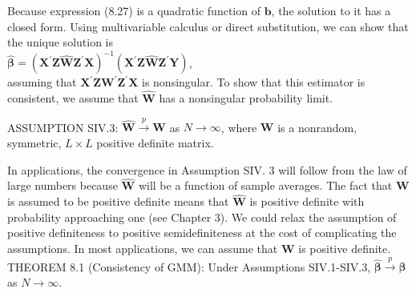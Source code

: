 \documentclass[10pt]{article}
\begin{document}
Because expression (8.27) is a quadratic function of $\mathbf{b}$, the solution to it has a closed form. Using multivariable calculus or direct substitution, we can show that the unique solution is\\
$\hat{\boldsymbol{\beta}}=\left(\mathbf{X}^{\prime} \mathbf{Z} \hat{\mathbf{W}} \mathbf{Z}^{\prime} \mathbf{X}\right)^{-1}\left(\mathbf{X}^{\prime} \mathbf{Z} \hat{\mathbf{W}} \mathbf{Z}^{\prime} \mathbf{Y}\right)$,\\
assuming that $\mathbf{X}^{\prime} \mathbf{Z} \mathbf{W}^{\prime} \mathbf{Z}^{\prime} \mathbf{X}$ is nonsingular. To show that this estimator is consistent, we assume that $\hat{\mathbf{W}}$ has a nonsingular probability limit.

ASSUMPTION SIV.3: $\hat{\mathbf{W}} \xrightarrow{p} \mathbf{W}$ as $N \rightarrow \infty$, where $\mathbf{W}$ is a nonrandom, symmetric, $L \times L$ positive definite matrix.

In applications, the convergence in Assumption SIV. 3 will follow from the law of large numbers because $\hat{\mathbf{W}}$ will be a function of sample averages. The fact that $\mathbf{W}$ is assumed to be positive definite means that $\hat{\mathbf{W}}$ is positive definite with probability approaching one (see Chapter 3). We could relax the assumption of positive definiteness to positive semidefiniteness at the cost of complicating the assumptions. In most applications, we can assume that $\mathbf{W}$ is positive definite.\\
THEOREM 8.1 (Consistency of GMM): Under Assumptions SIV.1-SIV.3, $\hat{\boldsymbol{\beta}} \xrightarrow{p} \boldsymbol{\beta}$ as $N \rightarrow \infty$.
\end{document}
